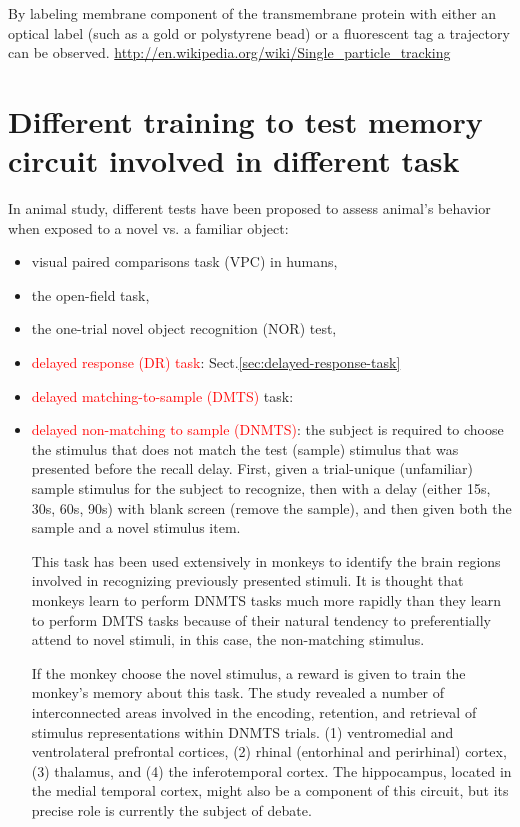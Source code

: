 By labeling membrane component of the transmembrane protein with either an
optical label (such as a gold or polystyrene bead) or a fluorescent tag a
trajectory can be observed.
\url{http://en.wikipedia.org/wiki/Single_particle_tracking}





\section{Different training to test memory circuit involved in different task}
\label{sec:test-training-memory}

In animal study, different tests have been proposed to assess animal's behavior
when exposed to a novel vs. a familiar object:
\begin{itemize}
  \item  visual paired comparisons task (VPC) in humans, 
  
  \item the open-field task, 
  
  \item the one-trial novel object recognition (NOR) test,  
  
  \item \textcolor{red}{delayed response (DR) task}: 
  Sect.\ref{sec:delayed-response-task}
  
  \item \textcolor{red}{delayed matching-to-sample (DMTS)} task:
  
  \item  \textcolor{red}{delayed non-matching to sample (DNMTS)}:
  the subject is required to choose the stimulus that does not match the test
  (sample) stimulus that was presented before the recall delay.
  First, given a trial-unique (unfamiliar) sample stimulus for the subject to
  recognize, then with a delay (either 15s, 30s, 60s, 90s) with blank screen
  (remove the sample), and then given both the sample and a novel stimulus item.
  
  
  This task has been used extensively in monkeys to identify the brain regions
  involved in recognizing previously presented stimuli.
  It is thought that monkeys learn to perform DNMTS tasks much more rapidly than
  they learn to perform DMTS tasks because of their natural tendency to
  preferentially attend to novel stimuli, in this case, the non-matching
  stimulus.
  
  If the monkey choose the novel stimulus, a reward is given
  to train the monkey's memory about this task. The study revealed a number of
  interconnected areas involved in the encoding, retention, and retrieval of
  stimulus representations within DNMTS trials.
  (1) ventromedial and ventrolateral prefrontal cortices, (2) rhinal (entorhinal
  and perirhinal) cortex, (3) thalamus, and (4) the inferotemporal cortex.
  The hippocampus, located in the medial temporal cortex, might also be a
  component of this circuit, but its precise role is currently the subject of
  debate.
  

\end{itemize}
